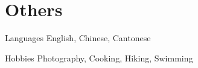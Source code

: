 \documentclass{tccv}
\begin{document}

\section{Others}

\begin{factlist}

\item{Languages}  {English, Chinese, Cantonese}
\item{Hobbies}
     {Photography, Cooking, Hiking, Swimming}

\end{factlist}


\begin{comment}

\newpage


\section{Honors and Awards}

\begin{factlist}

\item{2018}
     {Oberwolfach Leibniz Graduate Student Travel Grant}
\item{2018}
     {John W. Milnor Endowed Graduate Travel Grant}
\item{2017}
     {Stony Brook Summer Research Grant}

\end{factlist}




\section{Presentations}

\begin{factlist}

\item{Invited Talks}
     {\small{
     \textbf{GSCAGT}, Temple University, Jun 2018;\\
     \textbf{GSTGC}, UIC, Apr 2018;\\
     \textbf{Algebraic Geometry Seminar}, Stony Brook Univ., Jan 2018;\\
     \textbf{RIT Seminar}, Univ. of Maryland, Sep 2017;\\
     \textbf{Algebraic Geometry Seminar}, Leibniz Univ. Hannover, Germany, Sep 2015;\\
     \textbf{Algebraic Geometry Seminar}, Zhejiang Univ., China, Dec 2014;}}
     

\end{comment}
\end{document}
